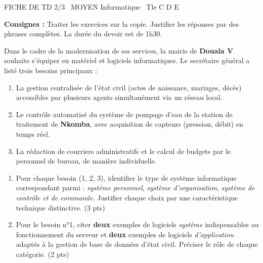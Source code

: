 \documentclass[11pt]{article}
\begin{document}
\begin{tcolorbox}[enhanced,colback=popink,colframe=popink,arc=10pt,boxrule=0pt,left=12pt,right=12pt,top=9pt,bottom=9pt]
{\color{white}\popxbold\small FICHE DE TD 2/3 \textbullet\ MOYEN \hfill Informatique \textbullet\ Tle C D E\par}
\end{tcolorbox}
\vspace{4pt}
\noindent\textbf{Consignes :} Traiter les exercices sur la copie. Justifier les réponses par des phrases complètes. La durée du devoir est de 1h30.

\begin{exercice}
Dans le cadre de la modernisation de ses services, la mairie de \textbf{Douala V} souhaite s'équiper en matériel et logiciels informatiques. Le secrétaire général a listé trois besoins principaux :
\begin{enumerate}
    \item La gestion centralisée de l'état civil (actes de naissance, mariages, décès) accessibles par plusieurs agents simultanément via un réseau local.
    \item Le contrôle automatisé du système de pompage d'eau de la station de traitement de \textbf{Nkomba}, avec acquisition de capteurs (pression, débit) en temps réel.
    \item La rédaction de courriers administratifs et le calcul de budgets par le personnel de bureau, de manière individuelle.
\end{enumerate}
\begin{enumerate}
    \item Pour chaque besoin (1, 2, 3), identifier le type de système informatique correspondant parmi : \textit{système personnel}, \textit{système d'organisation}, \textit{système de contrôle et de commande}. Justifier chaque choix par une caractéristique technique distinctive. (3 pts)
    \item Pour le besoin n°1, citer \textbf{deux} exemples de logiciels \textit{système} indispensables au fonctionnement du serveur et \textbf{deux} exemples de logiciels \textit{d'application} adaptés à la gestion de base de données d'état civil. Préciser le rôle de chaque catégorie. (2 pts)
\end{enumerate}
\end{exercice}
\end{document}
